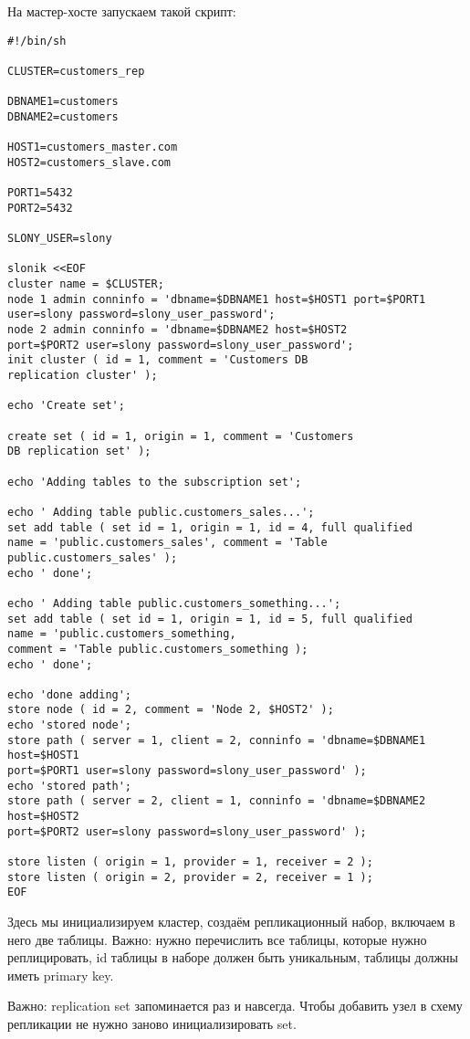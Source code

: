 На мастер-хосте запускаем такой скрипт:
\begin{verbatim}
#!/bin/sh

CLUSTER=customers_rep

DBNAME1=customers
DBNAME2=customers

HOST1=customers_master.com
HOST2=customers_slave.com

PORT1=5432
PORT2=5432

SLONY_USER=slony

slonik <<EOF
cluster name = $CLUSTER;
node 1 admin conninfo = 'dbname=$DBNAME1 host=$HOST1 port=$PORT1 
user=slony password=slony_user_password';
node 2 admin conninfo = 'dbname=$DBNAME2 host=$HOST2 
port=$PORT2 user=slony password=slony_user_password';
init cluster ( id = 1, comment = 'Customers DB 
replication cluster' );

echo 'Create set';

create set ( id = 1, origin = 1, comment = 'Customers 
DB replication set' );

echo 'Adding tables to the subscription set';

echo ' Adding table public.customers_sales...';
set add table ( set id = 1, origin = 1, id = 4, full qualified 
name = 'public.customers_sales', comment = 'Table public.customers_sales' );
echo ' done';

echo ' Adding table public.customers_something...';
set add table ( set id = 1, origin = 1, id = 5, full qualified 
name = 'public.customers_something, 
comment = 'Table public.customers_something );
echo ' done';

echo 'done adding';
store node ( id = 2, comment = 'Node 2, $HOST2' );
echo 'stored node';
store path ( server = 1, client = 2, conninfo = 'dbname=$DBNAME1 host=$HOST1 
port=$PORT1 user=slony password=slony_user_password' );
echo 'stored path';
store path ( server = 2, client = 1, conninfo = 'dbname=$DBNAME2 host=$HOST2 
port=$PORT2 user=slony password=slony_user_password' );

store listen ( origin = 1, provider = 1, receiver = 2 );
store listen ( origin = 2, provider = 2, receiver = 1 );
EOF
\end{verbatim}

Здесь мы инициализируем кластер, создаём репликационный набор, включаем в него две таблицы. 
Важно: нужно перечислить все таблицы, которые нужно реплицировать, id таблицы в наборе должен быть уникальным, 
таблицы должны иметь primary key.

Важно: replication set запоминается раз и навсегда. Чтобы добавить узел в схему репликации не нужно заново инициализировать set.

